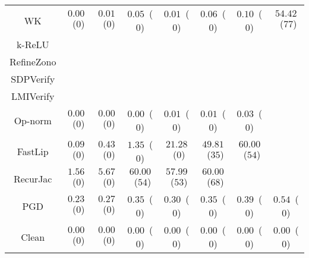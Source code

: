 \begin{table}
{\begin{tabular}{c|c|c|c|c|c|c|c}
           WK &  $0.00$~($0$) &  $0.01$~($0$) &  $0.05$~($0$) &  $0.01$~($0$) &  $0.06$~($0$) &  $0.10$~($0$) & $54.42$~($77$) \\
       k-ReLU &               &               &               &               &               &               &               \\
   RefineZono &               &               &               &               &               &               &               \\
    SDPVerify &               &               &               &               &               &               &               \\
    LMIVerify &               &               &               &               &               &               &               \\
      Op-norm &  $0.00$~($0$) &  $0.00$~($0$) &  $0.00$~($0$) &  $0.01$~($0$) &  $0.01$~($0$) &  $0.03$~($0$) &               \\
      FastLip &  $0.09$~($0$) &  $0.43$~($0$) &  $1.35$~($0$) & $21.28$~($0$) & $49.81$~($35$) & $60.00$~($54$) &               \\
     RecurJac &  $1.56$~($0$) &  $5.67$~($0$) & $60.00$~($54$) & $57.99$~($53$) & $60.00$~($68$) &               &               \\
\hline
          PGD &  $0.23$~($0$) &  $0.27$~($0$) &  $0.35$~($0$) &  $0.30$~($0$) &  $0.35$~($0$) &  $0.39$~($0$) &  $0.54$~($0$) \\
\hline
        Clean &  $0.00$~($0$) &  $0.00$~($0$) &  $0.00$~($0$) &  $0.00$~($0$) &  $0.00$~($0$) &  $0.00$~($0$) &  $0.00$~($0$) \\

    \bottomrule
    \end{tabular}
    }
    \label{table:exp-A-robust-accuracy-time-cifar10-0}
\end{table}
        

